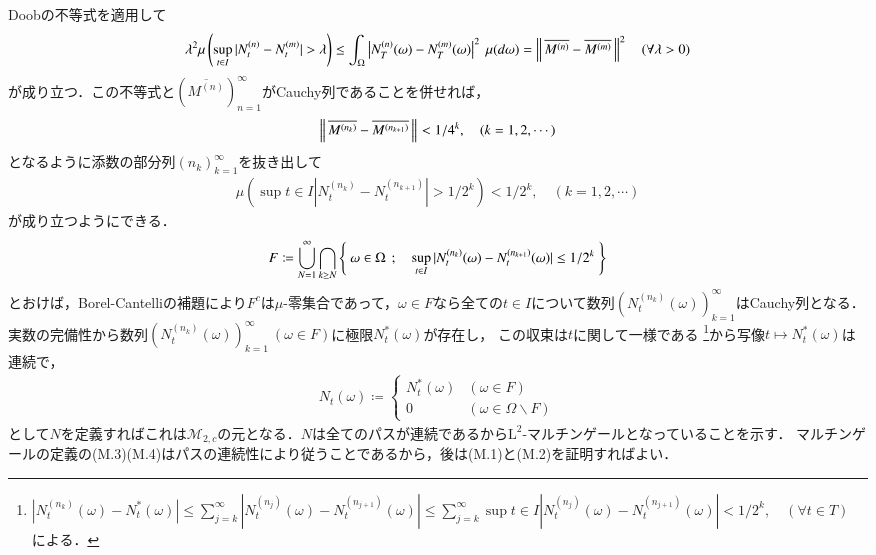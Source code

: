 \begin{prf}
		Doobの不等式を適用して
		\begin{align}
			\lambda^2 \mu\left(\operatorname*{sup}_{t \in I} |N^{(n)}_t - N^{(m)}_t| > \lambda\right) \leq \int_{\Omega} \left| N^{(n)}_T(\omega) - N^{(m)}_T(\omega) \right|^2\ \mu(d\omega)
			= \left\|\, \overline{M^{(n)}} - \overline{M^{(m)}}\, \right\|_{}^2 \quad (\forall \lambda > 0)
		\end{align}
		が成り立つ．この不等式と$\left(\overline{M^{(n)}}\right)_{n=1}^{\infty}$がCauchy列であることを併せれば，
		\begin{align}
			\left\|\, \overline{M^{(n_k)}} - \overline{M^{(n_{k+1})}}\, \right\|_{} < 1/4^k, \quad (k = 1,2,\cdots) \label{eq:mart_hilbert_1}
		\end{align}
		となるように添数の部分列$(n_k)_{k=1}^{\infty}$を抜き出して
		\begin{align}
			\mu\left(\sup{t \in I}{|N^{(n_k)}_t - N^{(n_{k+1})}_t| > 1/2^k}\right) < 1/2^k, \quad (k=1,2,\cdots)
		\end{align}
		が成り立つようにできる．
		\begin{align}
			F \coloneqq \bigcup_{N=1}^{\infty} \bigcap_{k \geq N} \left\{\ \omega \in \Omega\ \, ; \quad \operatorname*{sup}_{t \in I} |N^{(n_k)}_t(\omega) - N^{(n_{k+1})}_t(\omega)| \leq 1/2^k\ \right\}
		\end{align}
		とおけば，Borel-Cantelliの補題により$F^c$は$\mu$-零集合であって，$\omega \in F$なら全ての$t \in I$について数列$\left(N^{(n_k)}_t(\omega)\right)_{k=1}^{\infty}$はCauchy列となる．
		実数の完備性から数列$\left(N^{(n_k)}_t(\omega)\right)_{k=1}^{\infty}\ (\omega \in F)$に極限$N^*_t(\omega)$が存在し，
		この収束は$t$に関して一様である
		\footnote{
			$\left| N^{(n_k)}_t(\omega) - N^*_t(\omega) \right| \leq \sum_{j=k}^{\infty} \left| N^{(n_j)}_t(\omega) - N^{(n_{j+1})}_t(\omega) \right|
			\leq \sum_{j=k}^{\infty} \sup{t \in I}{\left| N^{(n_j)}_t(\omega) - N^{(n_{j+1})}_t(\omega) \right|} < 1/2^k, \quad (\forall t \in T)$
			による．
		}から写像$t \longmapsto N^*_t(\omega)$は連続で，
		\begin{align}
			N_t(\omega) \coloneqq 
			\begin{cases}
				N^*_t(\omega) & (\omega \in F) \\
				0 & (\omega \in \Omega \backslash F)
			\end{cases}
		\end{align}
		として$N$を定義すればこれは$\mathcal{M}_{2,c}$の元となる．$N$は全てのパスが連続であるから$\mathrm{L}^2$-マルチンゲールとなっていることを示す．
		マルチンゲールの定義の(M.3)(M.4)はパスの連続性により従うことであるから，後は(M.1)と(M.2)を証明すればよい．
		\begin{description}

\end{description}
\end{prf}
